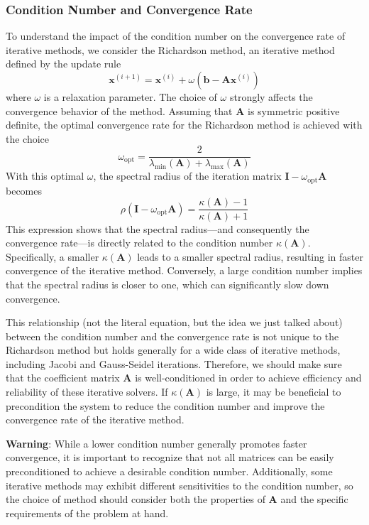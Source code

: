\subsubsection{Condition Number and Convergence Rate}
To understand the impact of the condition number on the convergence rate of iterative methods, we consider the Richardson method, an iterative method defined by the update rule
\begin{equation*}
    \mathbf{x}^{(i+1)} = \mathbf{x}^{(i)} + \omega (\mathbf{b} - \mathbf{A}\mathbf{x}^{(i)})
\end{equation*}
where $\omega$ is a relaxation parameter. The choice of $\omega$ strongly affects the convergence behavior of the method. Assuming that $\mathbf{A}$ is symmetric positive definite, the optimal convergence rate for the Richardson method is achieved with the choice
\begin{equation*}
    \omega_{\text{opt}} = \frac{2}{\lambda_{\min}(\mathbf{A}) + \lambda_{\max}(\mathbf{A})}
\end{equation*}
With this optimal $\omega$, the spectral radius of the iteration matrix $\mathbf{I} - \omega_{\text{opt}} \mathbf{A}$ becomes
\begin{equation*}
    \rho(\mathbf{I} - \omega_{\text{opt}} \mathbf{A}) = \frac{\kappa(\mathbf{A}) - 1}{\kappa(\mathbf{A}) + 1}
\end{equation*}
This expression shows that the spectral radius---and consequently the convergence rate---is directly related to the condition number $\kappa(\mathbf{A})$. Specifically, a smaller $\kappa(\mathbf{A})$ leads to a smaller spectral radius, resulting in faster convergence of the iterative method. Conversely, a large condition number implies that the spectral radius is closer to one, which can significantly slow down convergence.

This relationship (not the literal equation, but the idea we just talked about) between the condition number and the convergence rate is not unique to the Richardson method but holds generally for a wide class of iterative methods, including Jacobi and Gauss-Seidel iterations. Therefore, we should make sure that the coefficient matrix $\mathbf{A}$ is well-conditioned in order to achieve efficiency and reliability of these iterative solvers. If $\kappa(\mathbf{A})$ is large, it may be beneficial to precondition the system to reduce the condition number and improve the convergence rate of the iterative method.

\begin{warningBox}
    \textbf{Warning}: While a lower condition number generally promotes faster convergence, it is important to recognize that not all matrices can be easily preconditioned to achieve a desirable condition number. Additionally, some iterative methods may exhibit different sensitivities to the condition number, so the choice of method should consider both the properties of $\mathbf{A}$ and the specific requirements of the problem at hand.
\end{warningBox}
